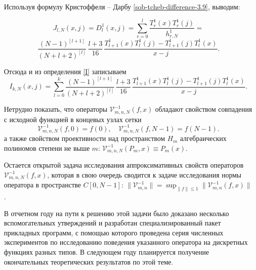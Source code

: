 Используя формулу Кристоффеля -- Дарбу \eqref{sob-tcheb-difference-3.9}, выводим:

\begin{equation*}
  J_{l,N} (x,j) = D^{1}_{l} (x,j) =
  \sum_{r=0}^{l} \frac{T^{1}_{r}(x) T^{1}_{r}(j)}{h^{1}_{r,N}} =
\end{equation*}
\begin{equation}\label{krist}
  \frac{(N-1)^{[l+1]}}{(N+l+2)^{[l]}} \, \frac{l+3}{16}\,
  \frac{T_{l+1}^1(x) T_{l}^1(j) - T_{l+1}^1(j) T_{l}^1(x)}{x-j}.
\end{equation}

Отсюда и из определения \eqref{I} записываем%
\begin{equation*}
  I_{k,N}(x,j) = %
  \sum_{l=0}^{k} \frac{(N-1)^{[l+1]}}{(N+l+2)^{[l]}}\,\frac{l+3}{16}\,
  \frac{T_{l+1}^1(x) T_{l}^1(j) - T_{l+1}^1(j) T_{l}^1(x)}{x-j}.
\end{equation*}



Нетрудно показать, что операторы $\mathcal{V}_{m,n,N}^{-1}(f,x)$ обладают свойством совпадения с исходной функцией в концевых узлах сетки
$$
\mathcal{V}_{m,n,N}^{-1}(f,0)= f(0), \quad \mathcal{V}_{m,n,N}^{-1}(f,N-1)= f(N-1).
$$
а также свойством проективности над пространством $H_{m}$ алгебраических полиномов степени не выше $m$: $\mathcal{V}_{m,n,N}^{-1}(P_m,x)\equiv P_m(x)$.

Остается открытой задача исследования аппроксимативных свойств операторов $\mathcal{V}_{m,n,N}^{-1}(f,x)$, которая в свою очередь сводится к задаче исследования нормы оператора в пространстве $C[0, N-1]$:
$\| \mathcal{V}^{-1}_{m,n} \| = \sup_{\| f \| \leq 1} \| \mathcal{V}^{-1}_{m,n}(f,x) \|$.

В отчетном году на пути к решению этой задачи было доказано несколько вспомогательных утверждений и разработан специализированный пакет прикладных программ, с помощью которого проведена серия численных экспериментов по исследованию поведения указанного оператора на дискретных функциях разных типов. В следующем году планируется получение окончательных теоретических результатов по этой теме.



